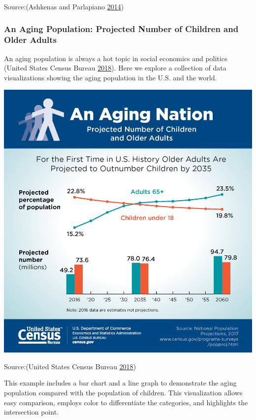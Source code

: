 \documentclass[]{book}
\begin{document}
Source:(Ashkenas and Parlapiano \protect\hyperlink{ref-recession_economy}{2014})

\hypertarget{an-aging-population-projected-number-of-children-and-older-adults}{%
\subsubsection{An Aging Population: Projected Number of Children and Older Adults}\label{an-aging-population-projected-number-of-children-and-older-adults}}

An aging population is always a hot topic in social economics and politics (United States Census Bureau \protect\hyperlink{ref-aging_nation}{2018}). Here we explore a collection of data visualizations showing the aging population in the U.S. and the world.

\includegraphics{images/aging_nation.jpg}

Source:(United States Census Bureau \protect\hyperlink{ref-aging_nation}{2018})

This example includes a bar chart and a line graph to demonstrate the aging population compared with the population of children. This visualization allows easy comparison, employs color to differentiate the categories, and highlights the intersection point.
\end{document}
